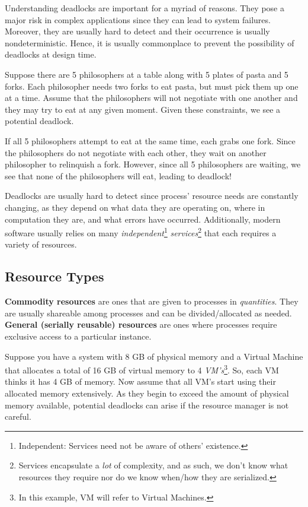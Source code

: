 \documentclass{report}
\newcommand{\definitionBegin}[1]{\begin{tcolorbox}[title={Definition: #1}]}
\newcommand{\definitionEnd}{\end{tcolorbox}}
\newcommand{\exampleBegin}[1]{\begin{tcolorbox}[colback=blue!5!white,colframe=black!75!blue,title={Example:
      #1}]}
\newcommand{\exampleEnd}{\end{tcolorbox}}
\begin{document}
Understanding deadlocks are important for a myriad of reasons. They pose a major risk in complex
applications since they can lead to system failures. Moreover, they are usually hard to detect and
their occurrence is usually nondeterministic. Hence, it is usually commonplace to prevent the
possibility of deadlocks at design time.

\exampleBegin{The Dining Philosophers Problem}
Suppose there are 5 philosophers at a table along with 5 plates of pasta and 5 forks. Each
philosopher needs two forks to eat pasta, but must pick them up one at a time. Assume that the
philosophers will not negotiate with one another and they may try to eat at any given moment. Given
these constraints, we see a potential deadlock.

If all 5 philosophers attempt to eat at the same time, each grabs one fork. Since the philosophers
do not negotiate with each other, they wait on another philosopher to 
relinquish a fork. However, since all 5 philosophers are waiting, we see that none of the
philosophers will eat, leading to deadlock!
\exampleEnd

Deadlocks are usually hard to detect since process' resource needs are constantly changing, as they
depend on what data they are operating on, where in computation they are, and what errors have
occurred. Additionally, modern software usually relies on many
\textit{independent}\footnote{Independent: Services need not be aware of others' existence.}
\textit{services}\footnote{Services encapsulate a \textit{lot} of complexity, and as such, we don't
  know what resources they require nor do we know when/how they are serialized.} that each requires
a variety of resources.  


\subsection{Resource Types}
\definitionBegin{Commodity and General Resources}
\textbf{Commodity resources} are ones that are given to processes in \textit{quantities}. They are
usually shareable among processes and can be divided/allocated as needed.
\tcblower
\textbf{General (serially reusable) resources} are ones where processes require exclusive access to
a particular instance.
\definitionEnd


\exampleBegin{Commitment Issues (Over-commitment)}
Suppose you have a system with 8 GB of physical memory and a Virtual Machine that allocates a total
of 16 GB of virtual memory to 4 \textit{VM's}\footnote{In this example, VM will refer to Virtual
  Machines.}. So, each VM thinks it has 4 GB of memory. Now assume that all VM's start using their
allocated memory extensively. As they begin to exceed the amount of physical memory available,
potential deadlocks can arise if the resource manager is not careful.
\exampleEnd
\end{document}
